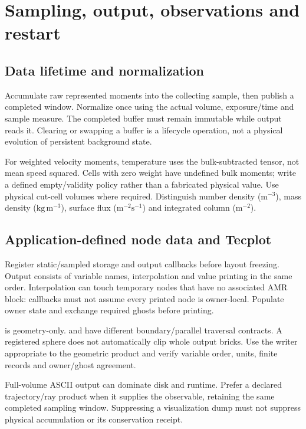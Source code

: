 \chapter{Sampling, output, observations and restart}\label{ch:output}
\section{Data lifetime and normalization}
Accumulate raw represented moments into the collecting sample, then publish
a completed window. Normalize once using the actual volume, exposure/time
and sample measure. The completed buffer must remain immutable while output
reads it. Clearing or swapping a buffer is a lifecycle operation, not a
physical evolution of persistent background state.

For weighted velocity moments, temperature uses the bulk-subtracted tensor,
not mean speed squared. Cells with zero weight have undefined bulk moments;
write a defined empty/validity policy rather than a fabricated physical value.
Use physical cut-cell volumes where required. Distinguish number density
($\mathrm{m^{-3}}$), mass density ($\mathrm{kg\,m^{-3}}$), surface flux
($\mathrm{m^{-2}s^{-1}}$) and integrated column ($\mathrm{m^{-2}}$).

\section{Application-defined node data and Tecplot}
Register static/sampled storage and output callbacks before layout freezing.
Output consists of variable names, interpolation and value printing in the
same order. Interpolation can touch temporary nodes that have no associated
AMR block: callbacks must not assume every printed node is owner-local.
Populate owner state and exchange required ghosts before printing.

 is geometry-only.
 and
 have different boundary/parallel traversal
contracts. A registered sphere does not automatically clip whole output
bricks. Use the writer appropriate to the geometric product and verify
variable order, units, finite records and owner/ghost agreement.

Full-volume ASCII output can dominate disk and runtime. Prefer a declared
trajectory/ray product when it supplies the observable, retaining the same
completed sampling window. Suppressing a visualization dump must not suppress
physical accumulation or its conservation receipt.

